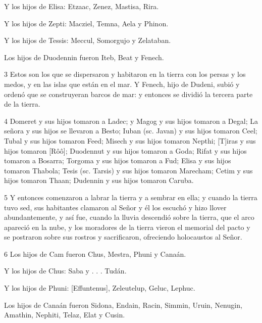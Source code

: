 \par Y los hijos de Elisa: Etzaac, Zenez, Mastisa, Rira.

\par Y los hijos de Zepti: Macziel, Temna, Aela y Phinon.

\par Y los hijos de Tessis: Meccul, Somorgujo y Zelataban.

\par Los hijos de Duodennin fueron Iteb, Beat y Fenech.

\par 3 Estos son los que se dispersaron y habitaron en la tierra con los persas y los medos, y en las islas que están en el mar. Y Fenech, hijo de Dudeni, subió y ordenó que se construyeran barcos de mar: y entonces se dividió la tercera parte de la tierra.

\par 4 Domeret y sus hijos tomaron a Ladec; y Magog y sus hijos tomaron a Degal; La señora y sus hijos se llevaron a Besto; Iuban (sc. Javan) y sus hijos tomaron Ceel; Tubal y sus hijos tomaron Feed; Misech y sus hijos tomaron Nepthi; [T]iras y sus hijos tomaron [Rôô]; Duodennut y sus hijos tomaron a Goda; Rifat y sus hijos tomaron a Bosarra; Torgoma y sus hijos tomaron a Fud; Elisa y sus hijos tomaron Thabola; Tesis (sc. Tarsis) y sus hijos tomaron Marecham; Cetim y sus hijos tomaron Thaan; Dudennin y sus hijos tomaron Caruba.

\par 5 Y entonces comenzaron a labrar la tierra y a sembrar en ella; y cuando la tierra tuvo sed, sus habitantes clamaron al Señor y él los escuchó y hizo llover abundantemente, y así fue, cuando la lluvia descendió sobre la tierra, que el arco apareció en la nube, y los moradores de la tierra vieron el memorial del pacto y se postraron sobre sus rostros y sacrificaron, ofreciendo holocaustos al Señor.

\par 6 Los hijos de Cam fueron Chus, Mestra, Phuni y Canaán.

\par Y los hijos de Chus: Saba y . . . Tudán.

\par Y los hijos de Phuni: [Effuntenus], Zeleutelup, Geluc, Lephuc.

\par Los hijos de Canaán fueron Sidona, Endain, Racin, Simmin, Uruin, Nenugin, Amathin, Nephiti, Telaz, Elat y Cusin.

